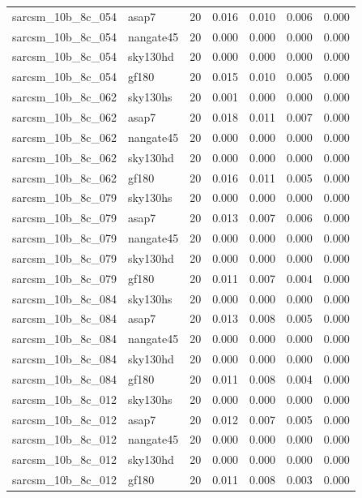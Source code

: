 \begin{tabular}{llrrrrr}
sarcsm\_10b\_8c\_054 & asap7 & 20 & 0.016 & 0.010 & 0.006 & 0.000 \\
sarcsm\_10b\_8c\_054 & nangate45 & 20 & 0.000 & 0.000 & 0.000 & 0.000 \\
sarcsm\_10b\_8c\_054 & sky130hd & 20 & 0.000 & 0.000 & 0.000 & 0.000 \\
sarcsm\_10b\_8c\_054 & gf180 & 20 & 0.015 & 0.010 & 0.005 & 0.000 \\
sarcsm\_10b\_8c\_062 & sky130hs & 20 & 0.001 & 0.000 & 0.000 & 0.000 \\
sarcsm\_10b\_8c\_062 & asap7 & 20 & 0.018 & 0.011 & 0.007 & 0.000 \\
sarcsm\_10b\_8c\_062 & nangate45 & 20 & 0.000 & 0.000 & 0.000 & 0.000 \\
sarcsm\_10b\_8c\_062 & sky130hd & 20 & 0.000 & 0.000 & 0.000 & 0.000 \\
sarcsm\_10b\_8c\_062 & gf180 & 20 & 0.016 & 0.011 & 0.005 & 0.000 \\
sarcsm\_10b\_8c\_079 & sky130hs & 20 & 0.000 & 0.000 & 0.000 & 0.000 \\
sarcsm\_10b\_8c\_079 & asap7 & 20 & 0.013 & 0.007 & 0.006 & 0.000 \\
sarcsm\_10b\_8c\_079 & nangate45 & 20 & 0.000 & 0.000 & 0.000 & 0.000 \\
sarcsm\_10b\_8c\_079 & sky130hd & 20 & 0.000 & 0.000 & 0.000 & 0.000 \\
sarcsm\_10b\_8c\_079 & gf180 & 20 & 0.011 & 0.007 & 0.004 & 0.000 \\
sarcsm\_10b\_8c\_084 & sky130hs & 20 & 0.000 & 0.000 & 0.000 & 0.000 \\
sarcsm\_10b\_8c\_084 & asap7 & 20 & 0.013 & 0.008 & 0.005 & 0.000 \\
sarcsm\_10b\_8c\_084 & nangate45 & 20 & 0.000 & 0.000 & 0.000 & 0.000 \\
sarcsm\_10b\_8c\_084 & sky130hd & 20 & 0.000 & 0.000 & 0.000 & 0.000 \\
sarcsm\_10b\_8c\_084 & gf180 & 20 & 0.011 & 0.008 & 0.004 & 0.000 \\
sarcsm\_10b\_8c\_012 & sky130hs & 20 & 0.000 & 0.000 & 0.000 & 0.000 \\
sarcsm\_10b\_8c\_012 & asap7 & 20 & 0.012 & 0.007 & 0.005 & 0.000 \\
sarcsm\_10b\_8c\_012 & nangate45 & 20 & 0.000 & 0.000 & 0.000 & 0.000 \\
sarcsm\_10b\_8c\_012 & sky130hd & 20 & 0.000 & 0.000 & 0.000 & 0.000 \\
sarcsm\_10b\_8c\_012 & gf180 & 20 & 0.011 & 0.008 & 0.003 & 0.000 \\

\end{tabular}
